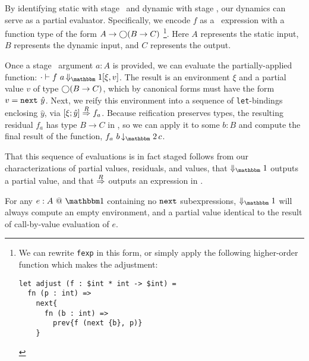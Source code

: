 
By identifying static with stage \bbone\ and dynamic with stage \bbtwo, 
our dynamics can serve as a partial evaluator.   
Specifically, we encode $f$ as a \lang\ expression with a function type of the form $A\to\bigcirc(B\to C)$
\cprotect\footnote{We can rewrite \texttt{fexp} in this form, or simply apply
the following higher-order function which makes the adjustment:
\begin{lstlisting} 
let adjust (f : $int * int -> $int) =
  fn (p : int) => 
    next{
      fn (b : int) => 
        prev{f (next {b}, p)}
    }
\end{lstlisting}}.
%
Here $A$ represents the static input, $B$ represents the dynamic input, and $C$ represents the output.

Once a stage \bbone\ argument $a:A$ is provided, we can evaluate the partially-applied
function:
$\cdot\vdash f~a \mathop{\redonesym} [\xi,v]$.
The result is an environment $\xi$ and a partial value $v$ of type $\bigcirc(B\to
C)$, which by canonical forms must have the form $v = {\tt next}~\hat y$. 
Next, we reify this environment into a sequence of \verb|let|-bindings
enclosing $\hat y$, via $[{\xi};{\hat y}]\overset{R}\Rightarrow{f_a}$. 
Because reification preserves types, the resulting residual $f_a$ has type $B\to C$ in \langTwo, so we can apply it to some $b:B$
and compute the final result of the function, $f_a~b \mathop{\tworedsym} c$.

That this sequence of evaluations is in fact staged follows from our
characterizations of partial values, residuals, and values, that $\redonesym$
outputs a partial value, and that $\overset{R}\Rightarrow$ outputs an expression in \langTwo.

\begin{remark}
For any $\colone{e}{A}$ containing no ${\tt next}$ subexpressions, $\redonesym$ will
always compute an empty environment, and a partial value identical to the result
of call-by-value evaluation of $e$.
\end{remark}

